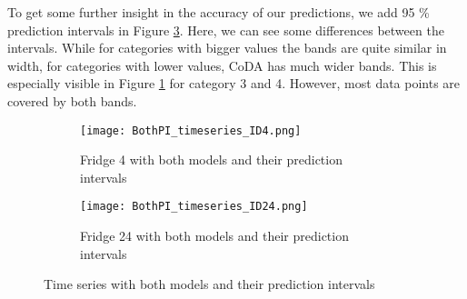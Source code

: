 To get some further insight in the accuracy of our predictions, we add 95 \% prediction intervals in Figure \ref{fig:TS BothPI}. Here, we can see some differences between the intervals. While for categories with bigger values the bands are quite similar in width, for categories with lower values, CoDA has much wider bands. This is especially visible in Figure \ref{fig:BothPI Fridge 4} for category 3 and 4. However, most data points are covered by both bands.
\begin{figure}[htb!]
\centering
\begin{subfigure}[b]{0.8\textwidth}
\texttt{[image: BothPI\_timeseries\_ID4.png]}
\caption{Fridge 4 with both models and their prediction intervals}
\label{fig:BothPI Fridge 4}
\end{subfigure}
\hfill
\begin{subfigure}[b]{0.8\textwidth}
\texttt{[image: BothPI\_timeseries\_ID24.png]}
\caption{Fridge 24 with both models and their prediction intervals}
\label{fig:BothPI Fridge 24}
\end{subfigure}
\caption{Time series with both models and their prediction intervals}
\label{fig:TS BothPI}
\end{figure}